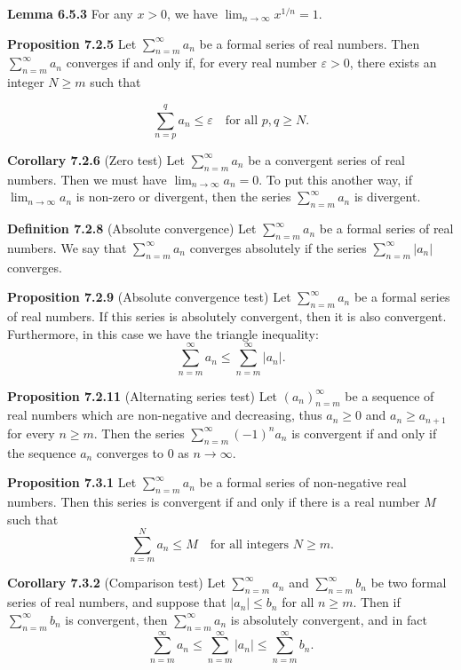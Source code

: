 \documentclass{article}
\begin{document}
\medskip

\textbf{Lemma 6.5.3} For any $x > 0$, we have
\(
\lim_{n \to \infty} x^{1/n} = 1.
\)

\medskip

\textbf{Proposition 7.2.5} Let $\sum_{n=m}^{\infty} a_n$ be a formal series of real numbers.
Then $\sum_{n=m}^{\infty} a_n$ converges if and only if, for every real number
$\varepsilon > 0$, there exists an integer $N \geq m$ such that

\[
    \sum_{n=p}^{q} a_n \leq \varepsilon \quad \text{for all } p, q \geq N.
\]

\medskip

\textbf{Corollary 7.2.6} (Zero test) Let $\sum_{n=m}^{\infty} a_n$ be a
convergent series of real numbers.
Then we must have
\(
\lim_{n \to \infty} a_n = 0.
\)
To put this another way, if $\lim_{n \to \infty} a_n$ is non-zero or
divergent, then the series $\sum_{n=m}^{\infty} a_n$ is divergent.

\medskip

\textbf{Definition 7.2.8} (Absolute convergence) Let $\sum_{n=m}^{\infty} a_n$
be a formal series of real numbers.
We say that $\sum_{n=m}^{\infty} a_n$ converges absolutely if the series
$\sum_{n=m}^{\infty} |a_n|$ converges.

\medskip

\textbf{Proposition 7.2.9} (Absolute convergence test) Let $\sum_{n=m}^{\infty} a_n$
be a formal series of real numbers.
If this series is absolutely convergent, then it is also convergent. Furthermore,
in this case we have the triangle inequality:
\[
    \sum_{n=m}^{\infty} a_n \leq \sum_{n=m}^{\infty} |a_n|.
\]

\medskip

\textbf{Proposition 7.2.11} (Alternating series test) Let $(a_n)_{n=m}^{\infty}$
be a sequence of real numbers which are non-negative and decreasing,
thus $a_n \geq 0$ and $a_n \geq a_{n+1}$ for every $n \geq m$.
Then the series $\sum_{n=m}^{\infty} (-1)^n a_n$ is convergent if and
only if the sequence $a_n$ converges to $0$ as $n \to \infty$.

\medskip

\textbf{Proposition 7.3.1} Let $\sum_{n=m}^{\infty} a_n$ be a formal series of
non-negative real numbers.
Then this series is convergent if and only if there is a real number $M$ such that
\[
    \sum_{n=m}^{N} a_n \leq M \quad \text{for all integers } N \geq m.
\]

\medskip

\textbf{Corollary 7.3.2} (Comparison test) Let $\sum_{n=m}^{\infty} a_n$ and
$\sum_{n=m}^{\infty} b_n$ be two formal series of real numbers, and suppose
that $|a_n| \leq b_n$ for all $n \geq m$.
Then if $\sum_{n=m}^{\infty} b_n$ is convergent, then $\sum_{n=m}^{\infty} a_n$
is absolutely convergent, and in fact
\[
    \sum_{n=m}^{\infty} a_n \leq \sum_{n=m}^{\infty} |a_n| \leq \sum_{n=m}^{\infty} b_n.
\]
\end{document}
